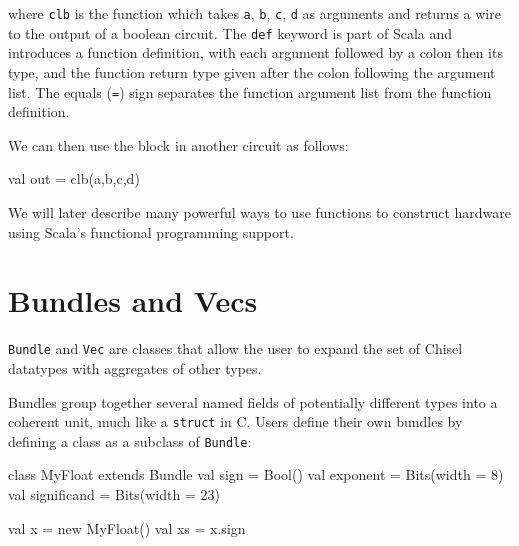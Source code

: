 \documentclass[twocolumn,10pt]{article}
\def\code#1{{\tt #1}}
\begin{document}
\noindent
where \code{clb} is the function which takes \code{a}, \code{b},
\code{c}, \code{d} as arguments and returns a wire to the output of a
boolean circuit.  The \code{def} keyword is part of Scala and
introduces a function definition, with each argument followed by a colon then its type,
and the function return type given after the colon following the
argument list.  The equals (\code{=})
sign separates the function argument list from the function
definition.

We can then use the block in another circuit as follows:
\begin{scala}
val out = clb(a,b,c,d)
\end{scala}






We will later describe many powerful ways to use functions to
construct hardware using Scala's functional programming support.

\section{Bundles and Vecs}

\code{Bundle} and \code{Vec} are classes that allow the user to expand
the set of Chisel datatypes with aggregates of other types.

Bundles group together several named fields of potentially different
types into a coherent unit, much like a \code{struct} in C. Users
define their own bundles by defining a class as a subclass of
\code{Bundle}:
\begin{scala}
class MyFloat extends Bundle {
  val sign        = Bool()
  val exponent    = Bits(width = 8)
  val significand = Bits(width = 23)
}

val x  = new MyFloat()
val xs = x.sign
\end{scala}
\end{document}

